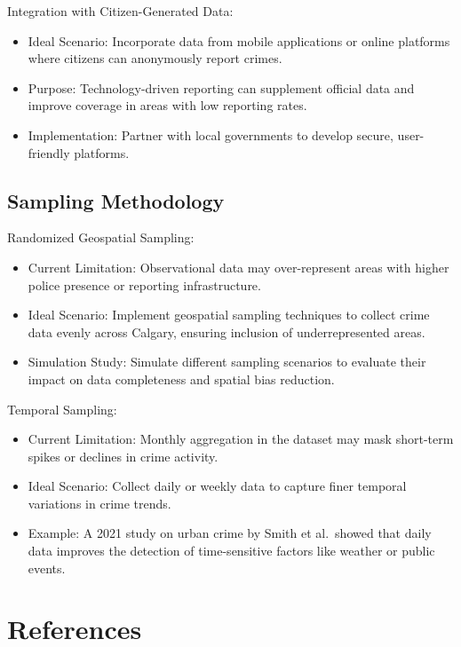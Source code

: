 \documentclass[
  letterpaper,
  DIV=11,
  numbers=noendperiod]{scrartcl}
\begin{document}
Integration with Citizen-Generated Data:

\begin{itemize}
\item
  Ideal Scenario: Incorporate data from mobile applications or online
  platforms where citizens can anonymously report crimes.
\item
  Purpose: Technology-driven reporting can supplement official data and
  improve coverage in areas with low reporting rates.
\item
  Implementation: Partner with local governments to develop secure,
  user-friendly platforms.
\end{itemize}

\subsection{Sampling Methodology}\label{sampling-methodology}

Randomized Geospatial Sampling:

\begin{itemize}
\item
  Current Limitation: Observational data may over-represent areas with
  higher police presence or reporting infrastructure.
\item
  Ideal Scenario: Implement geospatial sampling techniques to collect
  crime data evenly across Calgary, ensuring inclusion of
  underrepresented areas.
\item
  Simulation Study: Simulate different sampling scenarios to evaluate
  their impact on data completeness and spatial bias reduction.
\end{itemize}

Temporal Sampling:

\begin{itemize}
\item
  Current Limitation: Monthly aggregation in the dataset may mask
  short-term spikes or declines in crime activity.
\item
  Ideal Scenario: Collect daily or weekly data to capture finer temporal
  variations in crime trends.
\item
  Example: A 2021 study on urban crime by Smith et al.~showed that daily
  data improves the detection of time-sensitive factors like weather or
  public events.
\end{itemize}

\newpage

\section*{References}\label{references}
\end{document}
